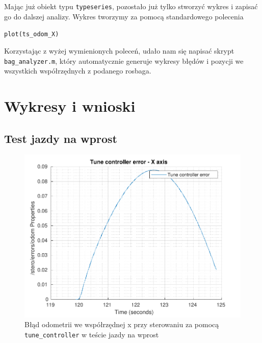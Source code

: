 \documentclass{mwrep}
\begin{document}
Mając już obiekt typu \texttt{typeseries}, pozostało już tylko stworzyć wykres i zapisać go do dalszej analizy.
Wykres tworzymy za pomocą standardowego polecenia
\begin{center}
	\texttt{plot(ts\_{}odom\_{}X)}
\end{center}

Korzystając z wyżej wymienionych poleceń, udało nam się napisać skrypt \texttt{bag\_{}analyzer.m}, który
automatycznie generuje wykresy błędów i pozycji we wszystkich współrzędnych z podanego rosbaga.  

\section{Wykresy i wnioski}
\label{pro1_figures}

\subsection{Test jazdy na wprost}
\label{pro1_figures_line}

\begin{figure}[H]
	\centering
	\includegraphics[scale=0.75]{./figures/pro1/line_tune/line_tune_x.pdf}
	\caption{Błąd odometrii we współrzędnej x przy sterowaniu za pomocą \texttt{tune\_{controller}} w teście jazdy na wprost}
\end{figure}
\end{document}
